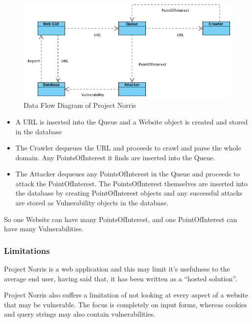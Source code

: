 \documentclass[12pt,a4paper]{article}
\begin{document}
\begin{figure}[!ht]
    \begin{center}
        \includegraphics[scale=0.7]{images/data_flow_diagram.png}    
    \end{center}
    \caption{Data Flow Diagram of Project Norris}
    \label{fig:dataflow}
\end{figure}

\begin{itemize}
    \item A URL is inserted into the Queue and a Website object is created and stored in the database
    \item The Crawler dequeues the URL and proceeds to crawl and parse the whole domain.  Any PointsOfInterest it finds are inserted into the Queue.
    \item The Attacker dequeues any PointsOfInterest in the Queue and proceeds to attack the PointOfInterest.  The PointsOfInterest themselves are inserted into the database by creating PointOfInterest objects and any successful attacks are stored as Vulnerability objects in the database.
\end{itemize}

So one Website can have many PointsOfInterest, and one PointOfInterest can have many Vulnerabilities.

\subsubsection{Limitations}
Project Norris is a web application and this may limit it’s usefulness to the average end user, having said that, it has been written as a “hosted solution”.

Project Norris also suffers a limitation of not looking at every aspect of a website that may be vulnerable.  The focus is completely on input forms, whereas cookies and query strings may also contain vulnerabilities.
\end{document}
